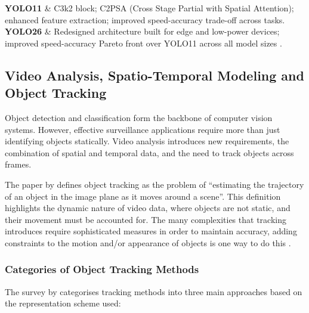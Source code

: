 \begin{table}[!htbp]
\begin{tabularx}{\textwidth}
		\textbf{YOLO11}  & C3k2 block; C2PSA (Cross Stage Partial with Spatial
		Attention); enhanced feature extraction; improved speed-accuracy trade-off
		across tasks.                                                                \\
		\addlinespace
		\textbf{YOLO26}  & Redesigned architecture built for edge and low-power
		devices; improved speed-accuracy Pareto front over YOLO11 across all model
		sizes \citep{jocher2025yolo26}.                                              \\
		\bottomrule
	\end{tabularx}
	\label{tab:yolo_evolution}
\end{table}

\subsection{Video Analysis, Spatio-Temporal Modeling and Object Tracking}
\label{sec:video_analysis_spatio_temporal_modeling_and_object_tracking}

Object detection and classification form the backbone of computer vision
systems. However, effective surveillance applications require more than just
identifying objects statically. Video analysis introduces new requirements, the
combination of spatial and temporal data, and the need to track objects across
frames.

The paper by \citet{yilmaz2006object} defines object tracking as the problem of
\enquote{estimating the trajectory of an object in the image plane as it moves
	around a scene}. This definition highlights the dynamic nature of video data,
where objects are not static, and their movement must be accounted for. The
many complexities that tracking introduces require sophisticated measures in
order to maintain accuracy, adding constraints to the motion and/or appearance
of objects is one way to do this \citep{yilmaz2006object}.

\subsubsection{Categories of Object Tracking Methods}

The survey by \citet{yilmaz2006object} categorises tracking methods into three
main approaches based on the representation scheme used:

